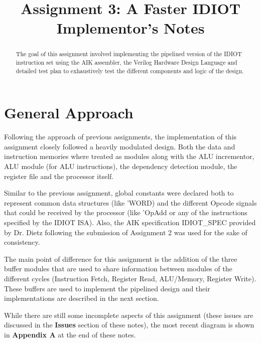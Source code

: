 \documentclass[conference]{IEEEtran}
\begin{document}
\title{Assignment 3: A Faster IDIOT\\Implementor's Notes}
\author{
        }

\maketitle

\begin{abstract}
The goal of this assignment involved implementing the pipelined version of 
the IDIOT instruction set using the AIK assembler, the Verilog Hardware
Design Language and detailed test plan to exhaustively test the different 
components and logic of the design. 
\end{abstract}

\section{General Approach}
Following the approach of previous assignments, the implementation of this 
assignment closely followed a heavily modulated design. Both the data and 
instruction memories where treated as modules along with the ALU incrementor,
ALU module (for ALU instructions), the dependency detection module, the 
register file and the processor itself. 

Similar to the previous assignment, global constants were declared both to 
represent common data structures (like 'WORD) and the different Opcode 
signals that could be received by the processor (like 'OpAdd or any of the 
instructions specified by the IDIOT ISA). Also, the AIK specification IDIOT\_SPEC
provided by Dr. Dietz following the submission of Assignment 2 was used
for the sake of consistency.

The main point of difference for this assignment is the addition of the three
buffer modules that are used to share information between modules of the 
different cycles (Instruction Fetch, Register Read, ALU/Memory, Register
Write). These buffers are used to implement the pipelined design and their 
implementations are described in the next section.

While there are still some incomplete aspects of this assignment (these issues 
are discussed in the \textbf{Issues} section of these notes), the most recent 
diagram is shown in \textbf{Appendix A} at the end of these notes. 
\end{document}
